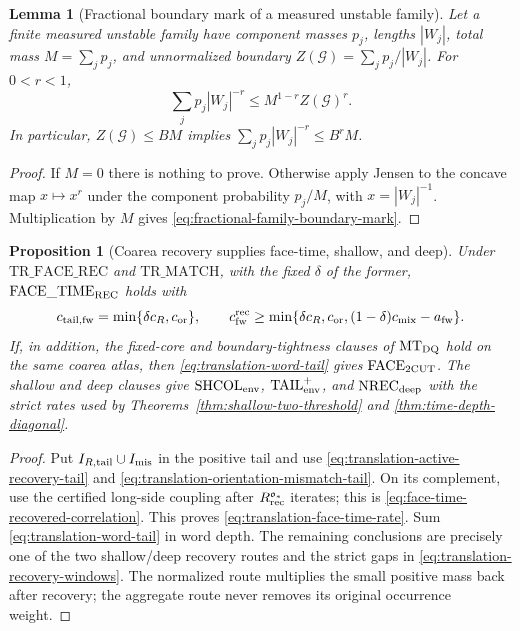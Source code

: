 \documentclass[11pt]{article}
\newtheorem{proposition}[theorem]{Proposition}
\newtheorem{lemma}[theorem]{Lemma}
\begin{document}
\begin{lemma}[Fractional boundary mark of a measured unstable family]
\label{lem:fractional-family-boundary-mark}
Let a finite measured unstable family have component masses $p_j$, lengths
$|W_j|$, total mass $M=\sum_jp_j$, and unnormalized boundary
$Z(\mathcal G)=\sum_jp_j/|W_j|$.  For $0<r<1$,
\begin{equation}
\label{eq:fractional-family-boundary-mark}
 \sum_jp_j|W_j|^{-r}
 \le M^{1-r}Z(\mathcal G)^r.
\end{equation}
In particular, $Z(\mathcal G)\le BM$ implies
$\sum_jp_j|W_j|^{-r}\le B^rM$.
\end{lemma}

\begin{proof}
If $M=0$ there is nothing to prove.  Otherwise apply Jensen to the concave
map $x\mapsto x^r$ under the component probability $p_j/M$, with
$x=|W_j|^{-1}$.  Multiplication by $M$ gives
\eqref{eq:fractional-family-boundary-mark}.
\end{proof}

\begin{proposition}[Coarea recovery supplies face-time, shallow, and deep]
\label{prop:translation-recovery-closes-three}
Under $\mathrm{TR\_FACE\_REC}$ and $\mathrm{TR\_MATCH}$, with the fixed
$\delta$ of the former,
$\mathrm{FACE\_TIME}_{\rm REC}$ holds with
\begin{equation}
\label{eq:translation-face-time-rate}
 c_{\rm tail,fw}=\min\{\delta c_R,c_{\rm or}\},\qquad
 c_{\rm fw}^{\rm rec}\ge
 \min\{\delta c_R,c_{\rm or},
             (1-\delta)c_{\rm mix}-a_{\rm fw}\}.
\end{equation}
If, in addition, the fixed-core and boundary-tightness clauses of
$\mathrm{MT}_{\rm DQ}$ hold on the same coarea atlas, then
\eqref{eq:translation-word-tail} gives $\mathrm{FACE}_{\rm 2CUT}$.
The shallow and deep clauses give
$\mathrm{SHCOL}_{\rm env}$,
$\mathrm{TAIL}_{\rm env}^{+}$, and $\mathrm{NREC}_{\rm deep}$ with the
strict rates used by Theorems~\ref{thm:shallow-two-threshold} and
\ref{thm:time-depth-diagonal}.
\end{proposition}

\begin{proof}
Put $I_{R,\rm tail}\cup I_{\rm mis}$ in the positive tail and use
\eqref{eq:translation-active-recovery-tail} and
\eqref{eq:translation-orientation-mismatch-tail}.  On its complement, use
the certified long-side coupling after
$R_{\rm rec}^{\mathfrak o_*}$ iterates;
this is
\eqref{eq:face-time-recovered-correlation}.  This proves
\eqref{eq:translation-face-time-rate}.  Sum
\eqref{eq:translation-word-tail} in word depth.  The remaining conclusions
are precisely one of the two shallow/deep recovery routes and the strict
gaps in \eqref{eq:translation-recovery-windows}.  The normalized route
multiplies the small positive mass back after recovery; the aggregate route
never removes its original occurrence weight.
\end{proof}
\end{document}
